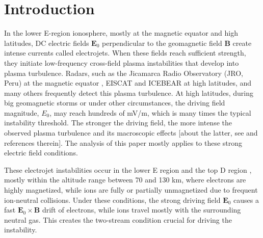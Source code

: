 \documentclass[draft]{agujournal2019}
\renewcommand{\vec}{\mathbf}
\begin{document}
\section{Introduction\label{Introduction}}

In the lower E-region ionosphere, mostly at the magnetic equator and high latitudes, DC electric fields
$\vec{E}_{0}$ perpendicular to the geomagnetic field $\vec{B}$ create intense
currents called electrojets. When these fields reach sufficient strength, they initiate low-frequency cross-field
plasma instabilities that develop into plasma turbulence. Radars, such as
the Jicamarca Radio Observatory (JRO, Peru) at the magnetic equator \cite{Hysell:Imaging02,Hysell:Combined07}, EISCAT \cite{Schlegel:Auroral90}
and ICEBEAR \cite{Ivarsen:Turbulence24} at high latitudes, and many others frequently detect this plasma turbulence. At high latitudes, during big geomagnetic
storms or under other circumstances, the driving field magnitude, $E_{0}$, may reach hundreds of mV/m, which is many times the typical instability
threshold. The stronger the driving field, the more intense the observed
plasma turbulence and its macroscopic effects [about the latter, see
 and references therein]. 
The analysis of this paper mostly applies to these strong electric field conditions.

These electrojet instabilities occur in the lower E region and the top
D region \cite{Blix:Experimental96}, mostly within the altitude range between
70 and 130 km, where electrons are highly magnetized, while ions are fully or partially
unmagnetized due to frequent ion-neutral collisions. Under these conditions,
the strong driving field $\vec{E}_{0}$ causes a fast $\vec{E}_{0}\times\vec
{B}$ drift of electrons, while ions travel mostly with the surrounding neutral gas.
This creates the two-stream condition crucial for driving the instability. 
\end{document}
